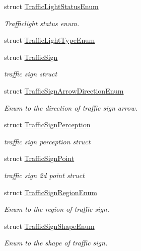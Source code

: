 \begin{DoxyCompactItemize}
struct \hyperlink{structmaf__perception__interface_1_1TrafficLightStatusEnum}{Traffic\+Light\+Status\+Enum}
\begin{DoxyCompactList}\small\item\em Trafficlight status enum. \end{DoxyCompactList}\item 
struct \hyperlink{structmaf__perception__interface_1_1TrafficLightTypeEnum}{Traffic\+Light\+Type\+Enum}
\item 
struct \hyperlink{structmaf__perception__interface_1_1TrafficSign}{Traffic\+Sign}
\begin{DoxyCompactList}\small\item\em traffic sign struct \end{DoxyCompactList}\item 
struct \hyperlink{structmaf__perception__interface_1_1TrafficSignArrowDirectionEnum}{Traffic\+Sign\+Arrow\+Direction\+Enum}
\begin{DoxyCompactList}\small\item\em Enum to the direction of traffic sign arrow. \end{DoxyCompactList}\item 
struct \hyperlink{structmaf__perception__interface_1_1TrafficSignPerception}{Traffic\+Sign\+Perception}
\begin{DoxyCompactList}\small\item\em traffic sign perception struct \end{DoxyCompactList}\item 
struct \hyperlink{structmaf__perception__interface_1_1TrafficSignPoint}{Traffic\+Sign\+Point}
\begin{DoxyCompactList}\small\item\em traffic sign 2d point struct \end{DoxyCompactList}\item 
struct \hyperlink{structmaf__perception__interface_1_1TrafficSignRegionEnum}{Traffic\+Sign\+Region\+Enum}
\begin{DoxyCompactList}\small\item\em Enum to the region of traffic sign. \end{DoxyCompactList}\item 
struct \hyperlink{structmaf__perception__interface_1_1TrafficSignShapeEnum}{Traffic\+Sign\+Shape\+Enum}
\begin{DoxyCompactList}\small\item\em Enum to the shape of traffic sign. \end{DoxyCompactList}\item 

\end{DoxyCompactItemize}
